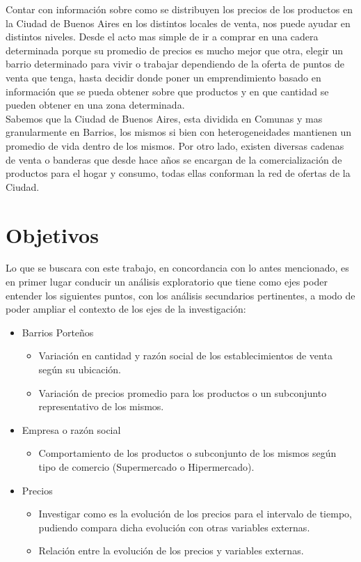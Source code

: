 Contar con información sobre como se distribuyen los precios de los productos en la Ciudad de Buenos Aires en los distintos locales de venta, nos puede ayudar en distintos niveles. Desde el acto mas simple de ir a comprar en una cadera determinada porque su promedio de precios es mucho mejor que otra, elegir un barrio determinado para vivir o trabajar dependiendo de la oferta de puntos de venta que tenga, hasta decidir donde poner un emprendimiento basado en información que se pueda obtener sobre que productos y en que cantidad se pueden obtener en una zona determinada.\\
Sabemos que la Ciudad de Buenos Aires, esta dividida en Comunas y mas granularmente en Barrios, los mismos si bien con heterogeneidades mantienen un promedio de vida dentro de los mismos. Por otro lado, existen diversas cadenas de venta o banderas que desde hace años se encargan de la comercialización de productos para el hogar y consumo, todas ellas conforman la red de ofertas de la Ciudad. \\


\section{Objetivos}
Lo que se buscara con este trabajo, en concordancia con lo antes mencionado, es en primer lugar conducir un análisis exploratorio que tiene como ejes poder entender los siguientes puntos, con los análisis secundarios pertinentes, a modo de poder ampliar el contexto de los ejes de la investigación:

\begin{itemize}
	\item Barrios Porteños
    \begin{itemize}
    	\item Variación en cantidad y razón social de los establecimientos de venta según su ubicación.
        \item Variación de precios promedio para los productos o un subconjunto representativo de los mismos.
    \end{itemize}
    \item Empresa o razón social
    \begin{itemize}
    	\item Comportamiento de los productos o subconjunto de los mismos según tipo de comercio (Supermercado o Hipermercado). 
    \end{itemize}
    \item Precios
    \begin{itemize}
    	\item  Investigar como es la evolución de los precios para el intervalo de tiempo, pudiendo compara dicha evolución con otras variables externas.
    	\item Relación entre la evolución de los precios y variables externas.
    \end{itemize}
\end{itemize}


